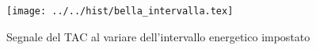 \begin{figure}[h] \centering\texttt{[image: ../../hist/bella\_intervalla.tex]}\caption{Segnale del TAC al variare dell'intervallo energetico impostato }\label{hist:bella_intervalla} \end{figure}
